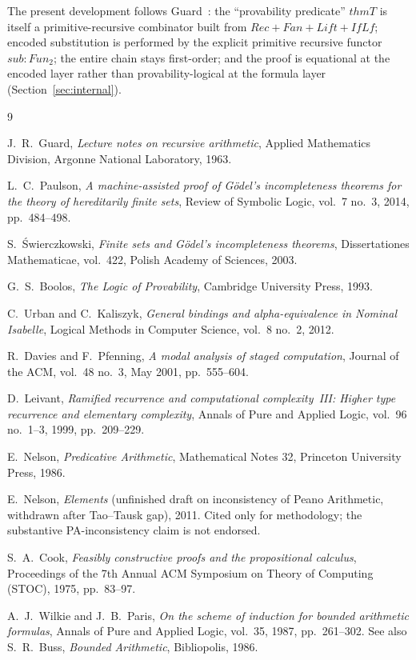 \documentclass[11pt]{article}
\begin{document}
The present development follows Guard~\cite{guard1963}: the
``provability predicate'' $\mathit{thmT}$ is itself a
primitive-recursive combinator built from $\mathit{Rec} + \mathit{Fan}
+ \mathit{Lift} + \mathit{IfLf}$; encoded substitution is performed by
the explicit primitive recursive functor $\mathit{sub} :
\mathit{Fun}_2$; the entire chain stays first-order; and the proof is
equational at the encoded layer rather than provability-logical at
the formula layer (Section~\ref{sec:internal}).

\begin{thebibliography}{9}

J.~R.~Guard,
\newblock \emph{Lecture notes on recursive arithmetic},
\newblock Applied Mathematics Division, Argonne National Laboratory, 1963.

L.~C.~Paulson,
\newblock \emph{A machine-assisted proof of G\"odel's incompleteness theorems for the theory of hereditarily finite sets},
\newblock Review of Symbolic Logic, vol.~7 no.~3, 2014, pp.~484--498.

S.~\'{S}wierczkowski,
\newblock \emph{Finite sets and G\"odel's incompleteness theorems},
\newblock Dissertationes Mathematicae, vol.~422, Polish Academy of Sciences, 2003.

G.~S.~Boolos,
\newblock \emph{The Logic of Provability},
\newblock Cambridge University Press, 1993.

C.~Urban and C.~Kaliszyk,
\newblock \emph{General bindings and alpha-equivalence in Nominal Isabelle},
\newblock Logical Methods in Computer Science, vol.~8 no.~2, 2012.

R.~Davies and F.~Pfenning,
\newblock \emph{A modal analysis of staged computation},
\newblock Journal of the ACM, vol.~48 no.~3, May 2001, pp.~555--604.

D.~Leivant,
\newblock \emph{Ramified recurrence and computational complexity~III: Higher type recurrence and elementary complexity},
\newblock Annals of Pure and Applied Logic, vol.~96 no.~1--3, 1999, pp.~209--229.

E.~Nelson,
\newblock \emph{Predicative Arithmetic},
\newblock Mathematical Notes 32, Princeton University Press, 1986.

E.~Nelson,
\newblock \emph{Elements} (unfinished draft on inconsistency of
  Peano Arithmetic, withdrawn after Tao--Tausk gap), 2011.
\newblock Cited only for methodology; the substantive
  PA-inconsistency claim is not endorsed.

S.~A.~Cook,
\newblock \emph{Feasibly constructive proofs and the propositional calculus},
\newblock Proceedings of the 7th Annual ACM Symposium on Theory of
  Computing (STOC), 1975, pp.~83--97.

A.~J.~Wilkie and J.~B.~Paris,
\newblock \emph{On the scheme of induction for bounded arithmetic formulas},
\newblock Annals of Pure and Applied Logic, vol.~35, 1987, pp.~261--302.
\newblock See also S.~R.~Buss, \emph{Bounded Arithmetic}, Bibliopolis, 1986.

\end{thebibliography}
\end{document}
